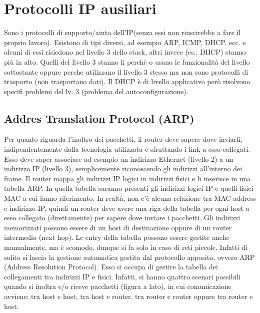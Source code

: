 \section{Protocolli IP ausiliari}
Sono i protocolli di supporto/aiuto dell'IP(senza essi non riuscirebbe a fare il proprio lavoro). Esistono di tipi diversi, ad esempio ARP, ICMP, DHCP, ecc. e alcuni di essi risiedono nel livello 3 dello stack, altri invece (es.: DHCP) stanno più in alto. Quelli del livello 3 stanno li perchè o usano le funzionalità del livello sottostante oppure perche utilizzano il livello 3 stesso ma non sono protocolli di trasporto (non trasportano dati). Il DHCP è di livello applicativo però risolvono specifi problemi del lv. 3 (problema del autoconfigurazione).
\subsection{Addres Translation Protocol (ARP)}
Per quanto riguarda l’inoltro dei pacchetti, il router deve sapere dove inviarli, indipendentemente dalla tecnologia utilizzata e sfruttando i link a esso collegati. Esso deve saper associare ad esempio un indirizzo Ethernet (livello 2) a un indirizzo IP (livello 3), semplicemente riconoscendo gli indirizzi all’interno dei frame. Il router mappa gli indirizzi IP logici in indirizzi fisici e li inserisce in una tabella ARP. In quella tabella saranno presenti gli indirizzi logici IP e quelli fisici MAC a cui fanno riferimento. In realtà, non c’è alcuna relazione tra MAC address e indirizzo IP, quindi un router deve avere una riga della tabella per ogni host a esso collegato (direttamente) per sapere dove inviare i pacchetti. Gli indirizzi memorizzati possono essere di un host di destinazione oppure di un router intermedio (next hop). Le entry della tabella possono essere gestite anche manualmente, ma è scomodo, dunque si fa solo in caso di reti piccole. Infatti di solito si lascia la gestione automatica gestita dal protocollo apposito, ovvero ARP (Address Resolution Protocol). Esso si occupa di gestire la tabella dei collegamenti tra indirizzi IP e fisici. Infatti, si hanno quattro scenari possibili quando si inoltra e/o riceve pacchetti (figura a lato), in cui comunicazione avviene: tra host e host, tra host e router, tra router e router oppure tra router e host.
